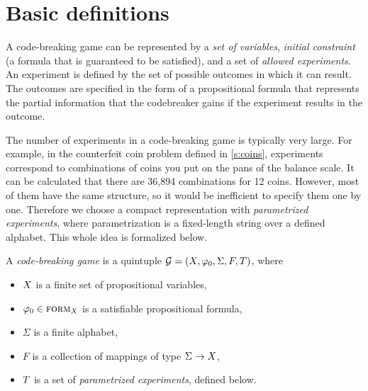 \section{Basic definitions}

A code-breaking game can be represented by a \emph{set of variables},
  \emph{initial constraint} (a formula that is guaranteed to be satisfied),
  and a set of \emph{allowed experiments}.
An experiment is defined by the set of possible outcomes in which it can result.
The outcomes are specified in the form of a propositional formula that
  represents the partial information
  that the codebreaker gains if the experiment results in the outcome.

The number of experiments in a code-breaking game is typically very large.
For example, in the counterfeit coin problem defined in \autoref{s:coins},
  experiments correspond to combinations of coins you put on the pans of the
  balance scale.
It can be calculated that there are 36,894 combinations for 12 coins.
However, most of them have the same structure,
  so it would be inefficient to specify them one by one.
Therefore we choose a compact representation with \emph{parametrized experiments},
  where parametrization is a fixed-length string over a defined alphabet.
This whole idea is formalized below.

\begin{definition} \label{def:game}
A \emph{code-breaking game} is a quintuple
  $\mathcal{G} = (X, \varphi_0, \Sigma, F, T)$, where
  \begin{itemize}
  \item $X$ is a finite set of propositional variables,
  \item $\varphi_0 \in \textsc{form}_X$ is a satisfiable propositional formula,
  \item $\Sigma$ is a finite alphabet,
  \item $F$ is a collection of mappings of type $\Sigma -> X$,
  \item $T$ is a set of \emph{parametrized experiments}, defined below.
  \end{itemize}
\end{definition}

